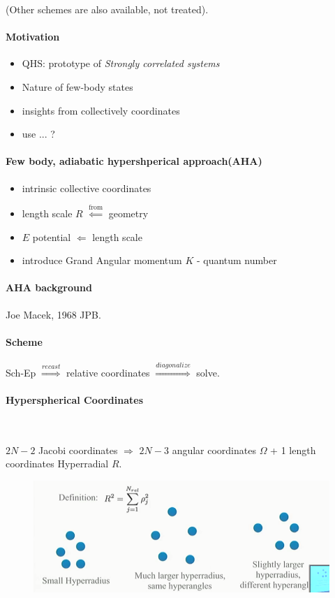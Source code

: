 \documentclass{article}
\numberwithin{equation}{subsection} %
\theoremstyle{definition}
\begin{document}
(Other schemes are also available, not treated).

\paragraph{Motivation}
\begin{itemize}
    \item QHS: prototype of \textit{Strongly correlated systems}
    \item Nature of few-body states
    \item insights from collectively coordinates
    \item use ... ?
\end{itemize}

\paragraph{Few body, adiabatic hypershperical approach\textbf{(AHA)}}

\begin{itemize}
    \item intrinsic collective coordinates
    \item length scale $R$ $\overset{\text{from}}{ \Leftarrow}$ geometry
    \item $E$ potential $ \Leftarrow$ length scale
    \item introduce Grand Angular momentum $K$ - quantum number
\end{itemize}

\paragraph{AHA background} Joe Macek, 1968 JPB.

\paragraph{Scheme} Sch-Ep $\overset{recast}{ \Rightarrow}$ relative
coordinates $ \overset{diagonalize}{ \Rightarrow}$ solve.

\paragraph{Hyperspherical Coordinates} $ $

$2N-2$ Jacobi coordinates $\Rightarrow$ $2N-3$ angular coordinates
$\Omega$ + 1 length coordinates Hyperradial $R$.
\begin{figure}[H]
    \centering
    \includegraphics[width=0.8\linewidth]{pics/rachel-wooten-purdue.png}
\end{figure}
\end{document}

